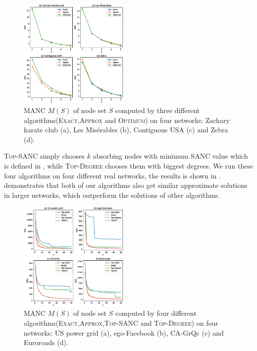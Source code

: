 \documentclass[sigconf]{acmart}
\begin{document}
\begin{figure}
    \centering
    \includegraphics[width=0.475\textwidth]{compare_effects_optimum.eps}
    \caption{MANC \(M(S)\) of node set \(S\) computed by three different algorithms(\textsc{Exact},\textsc{Approx} and \textsc{Optimum}) on four networks: Zachary karate club (a), Les Misérables (b), Contiguous USA (c) and Zebra (d).\label{pic:compare-effect-optimum}}
\end{figure}

\textsc{Top-SANC} simply chooses \(k\) absorbing nodes with minimum SANC value which is defined in , while \textsc{Top-Degree} chooses them with biggest degrees.
We run these four algorithms on four different real networks, the results is shown in .
 demonstrates that both of our algorithms also get similar approximate solutions in larger networks, which outperform the solutions of other algorithms.

\begin{figure}
    \centering
    \includegraphics[width=0.475\textwidth]{compare_effects_exact.eps}
    \caption{MANC \(M(S)\) of node set \(S\) computed by four different algorithms(\textsc{Exact},\textsc{Approx},\textsc{Top-SANC} and \textsc{Top-Degree}) on four networks: US power grid (a), ego-Facebook (b), CA-GrQc (c) and Euroroads (d).\label{pic:compare-effect}}
\end{figure}
\end{document}
